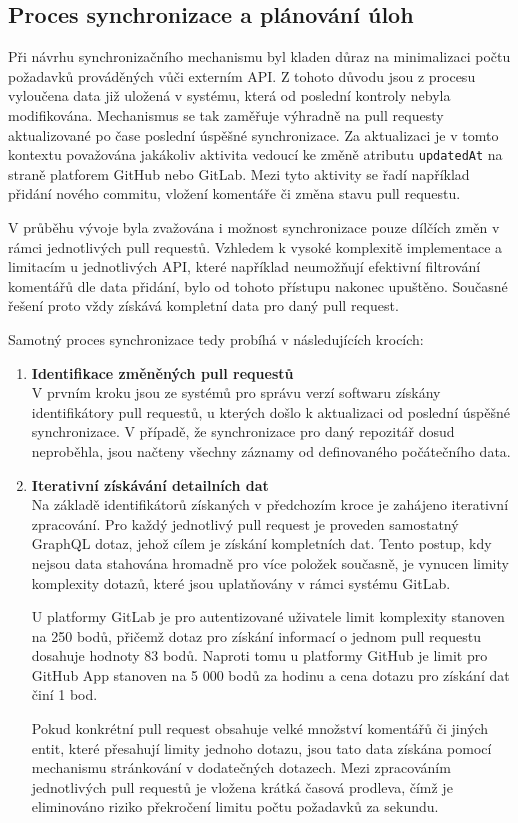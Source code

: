 \subsection{Proces synchronizace a plánování úloh}
Při návrhu synchronizačního mechanismu byl kladen důraz na minimalizaci počtu požadavků prováděných vůči externím API. Z tohoto důvodu jsou z procesu vyloučena data již uložená v systému, která od poslední kontroly nebyla modifikována. Mechanismus se tak zaměřuje výhradně na pull requesty aktualizované po čase poslední úspěšné synchronizace. Za aktualizaci je v tomto kontextu považována jakákoliv aktivita vedoucí ke změně atributu \texttt{updatedAt} na straně platforem GitHub nebo GitLab. Mezi tyto aktivity se řadí například přidání nového commitu, vložení komentáře či změna stavu pull requestu.

V průběhu vývoje byla zvažována i možnost synchronizace pouze dílčích změn v rámci jednotlivých pull requestů. Vzhledem k vysoké komplexitě implementace a limitacím u jednotlivých API, které například neumožňují efektivní filtrování komentářů dle data přidání, bylo od tohoto přístupu nakonec upuštěno. Současné řešení proto vždy získává kompletní data pro daný pull request.

Samotný proces synchronizace tedy probíhá v následujících krocích:
\begin{enumerate}
  \item \textbf{Identifikace změněných pull requestů}\\
  V prvním kroku jsou ze systémů pro správu verzí softwaru získány identifikátory pull requestů, u kterých došlo k aktualizaci od poslední úspěšné synchronizace. V případě, že synchronizace pro daný repozitář dosud neproběhla, jsou načteny všechny záznamy od definovaného počátečního data.
  \item \textbf{Iterativní získávání detailních dat}\\
  Na základě identifikátorů získaných v předchozím kroce je zahájeno iterativní zpracování. Pro každý jednotlivý pull request je proveden samostatný GraphQL dotaz, jehož cílem je získání kompletních dat. Tento postup, kdy nejsou data stahována hromadně pro více položek současně, je vynucen limity komplexity dotazů, které jsou uplatňovány v rámci systému GitLab.

  U platformy GitLab je pro autentizované uživatele limit komplexity stanoven na 250 bodů, přičemž dotaz pro získání informací o jednom pull requestu dosahuje hodnoty 83 bodů. Naproti tomu u platformy GitHub je limit pro GitHub App stanoven na 5 000 bodů za hodinu a cena dotazu pro získání dat činí 1 bod.

  Pokud konkrétní pull request obsahuje velké množství komentářů či jiných entit, které přesahují limity jednoho dotazu, jsou tato data získána pomocí mechanismu stránkování v dodatečných dotazech. Mezi zpracováním jednotlivých pull requestů je vložena krátká časová prodleva, čímž je eliminováno riziko překročení limitu počtu požadavků za sekundu.
\end{enumerate}

